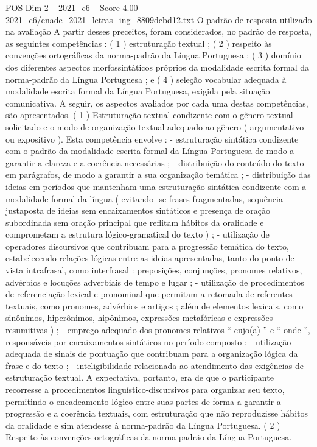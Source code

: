 \begin{textsample}{POS Dim 2 – 2021\_c6 – Score 4.00 – 2021\_c6/enade\_2021\_letras\_ing\_8809dcbd12.txt}
O padrão de resposta utilizado na avaliação A partir desses preceitos, foram considerados, no padrão de resposta, as seguintes competências : ( 1 ) estruturação textual ; ( 2 ) respeito às convenções ortográficas da norma-padrão da Língua Portuguesa ; ( 3 ) domínio dos diferentes aspectos morfossintáticos próprios da modalidade escrita formal da norma-padrão da Língua Portuguesa ; e ( 4 ) seleção vocabular adequada à modalidade escrita formal da Língua Portuguesa, exigida pela situação comunicativa.
A seguir, os aspectos avaliados por cada uma destas competências, são apresentados. ( 1 ) Estruturação textual condizente com o gênero textual solicitado e o modo de organização textual adequado ao gênero ( argumentativo ou expositivo ).
Esta competência envolve : - estruturação sintática condizente com o padrão da modalidade escrita formal da Língua Portuguesa de modo a garantir a clareza e a coerência necessárias ; - distribuição do conteúdo do texto em parágrafos, de modo a garantir a sua organização temática ; - distribuição das ideias em períodos que mantenham uma estruturação sintática condizente com a modalidade formal da língua ( evitando -se frases fragmentadas, sequência justaposta de ideias sem encaixamentos sintáticos e presença de oração subordinada sem oração principal que reflitam hábitos da oralidade e comprometam a estrutura lógico-gramatical do texto ) ; - utilização de operadores discursivos que contribuam para a progressão temática do texto, estabelecendo relações lógicas entre as ideias apresentadas, tanto do ponto de vista intrafrasal, como interfrasal : preposições, conjunções, pronomes relativos, advérbios e locuções adverbiais de tempo e lugar ; - utilização de procedimentos de referenciação lexical e pronominal que permitam a retomada de referentes textuais, como pronomes, advérbios e artigos ; além de elementos lexicais, como sinônimos, hiperônimos, hipônimos, expressões metafóricas e expressões resumitivas ) ; - emprego adequado dos pronomes relativos “ cujo(a) ” e “ onde ”, responsáveis por encaixamentos sintáticos no período composto ; - utilização adequada de sinais de pontuação que contribuam para a organização lógica da frase e do texto ; - inteligibilidade relacionada ao atendimento das exigências de estruturação textual.
A expectativa, portanto, era de que o participante recorresse a procedimentos linguístico-discursivos para organizar seu texto, permitindo o encadeamento lógico entre suas partes de forma a garantir a progressão e a coerência textuais, com estruturação que não reproduzisse hábitos da oralidade e sim atendesse à norma-padrão da Língua Portuguesa. ( 2 ) Respeito às convenções ortográficas da norma-padrão da Língua Portuguesa.

\end{textsample}
